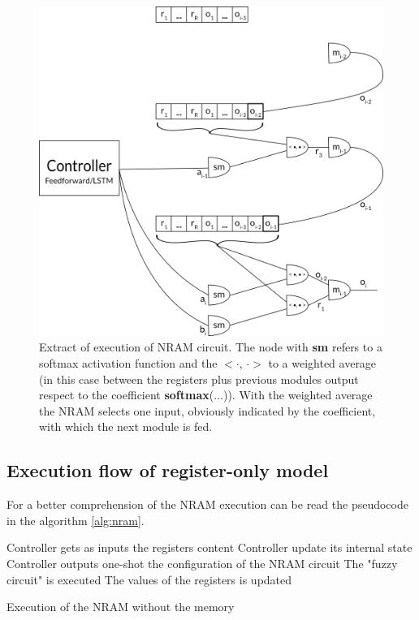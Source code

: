 \begin{figure}[t!]
	\centering
	\includegraphics[width=\textwidth]{figures/register-only-model.png}
	\caption{Extract of execution of NRAM circuit. The node with \textbf{sm} refers to a softmax activation function and the $<\cdot$, $\cdot>$ to a weighted average (in this case between the registers plus previous modules output respect to the coefficient \textbf{softmax}($\dots$)). With the weighted average the NRAM selects one input, obviously indicated by the coefficient, with which the next module is fed.}
	\label{fig:register-only-model}
\end{figure}

\subsection{Execution flow of register-only model}\label{subsec:execution-register-only}
For a better comprehension of the NRAM execution can be read the pseudocode in the algorithm \ref{alg:nram}.
\begin{algorithm}
	\begin{algorithmic}[1]
		\label{lst:nram:line-5}
			\State Controller gets as inputs the registers content\label{lst:nram:line-6}
				\State Controller update its internal state
			\EndIf
			\State Controller outputs one-shot the configuration of the NRAM circuit\label{lst:nram:line-8}
			\State The "fuzzy circuit" is executed \label{lst:nram:line-9}
			\State The values of the registers is updated\label{lst:nram:line-10}
		\EndFor
	\end{algorithmic}
	\caption{Execution of the NRAM without the memory}\label{alg:nram}
\end{algorithm}

